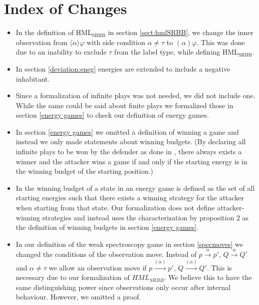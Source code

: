 \section{Index of Changes} \label{index}
\begin{itemize}
    \item In the definition of HML$_\text{SRBB}$ in section \ref{sect:hmlSRBB}, we change the inner observation from
    $\langle\alpha\rangle\varphi$ with side condition $\alpha \neq \tau$ to $(\alpha)\varphi$.
    This was done due to an inability to exclude $\tau$ from the label type, while defining HML$_\text{SRBB}$. 
    
    \item In section \ref{deviation:eneg} energies are extended to include a negative inhabitant. 
    
    \item Since a formalization of infinite plays was not needed, we did not include one. While the 
    same could be said about finite plays we formalized those in section \ref{energy games} to check our definition of energy games.
    
    \item In section \ref{energy games} we omitted a definition of winning a game and instead we only made statements about winning budgets. 
    (By declaring all infinite plays to be won by the defender as done in \cite{bisping2023lineartimebranchingtime}, 
    there always exists a winner and the attacker wins a game if and only if the starting energy is in the winning budget of the starting position.)
    
    \item In \cite{bisping2023lineartimebranchingtime} the winning budget of a state in an energy game 
    is defined as the set of all starting energies such that there exists a winning strategy for the attacker 
    when starting from that state. Our formalization does not define attacker-winning strategies and instead 
    uses the characterization by proposition $2$ \cite[p. 9]{bisping2023lineartimebranchingtime} as the definition of winning budgets in section \ref{energy games}.
    
    \item In our definition of the weak spectroscopy game in section \ref{specmoves} we changed the conditions of the observation move. 
    Instead of $p \overset{\alpha}{\longrightarrow}p'$, $Q \overset{\alpha}{\longrightarrow} Q'$ and $\alpha \neq \tau$
    we allow an observation move if  $p \overset{(\alpha)}{\longrightarrow}p'$, $Q \overset{(\alpha)}{\longrightarrow} Q'$.
    This is necessary due to our formalization of $HML_{SRBB}$. We believe this to have the same distinguishing power 
    since observations only occur after internal behaviour. However, we omitted a proof. 
    

\end{itemize}
